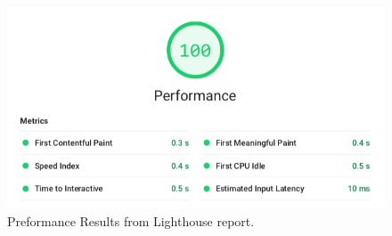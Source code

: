 \begin{markdown}
\bigskip

\begin{figure}[H]
  \includegraphics[width=13cm, center]{../../metrics/ZHAWoLighthousereportBAPreformance.png}
  \captionsetup{width=15.5cm}
  \caption [Lighthouse Preformance]{Preformance Results from Lighthouse report.}
  \label{fig:LighthousePreformance}
\end{figure}

\newpage

\end{markdown}


